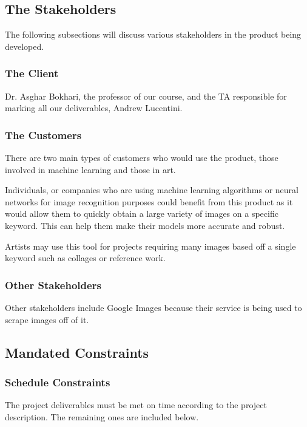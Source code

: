 \documentclass[12pt, titlepage]{article}
\begin{document}
\subsection{The Stakeholders}

The following subsections will discuss various stakeholders in the product being developed.

\subsubsection{The Client}

Dr. Asghar Bokhari, the professor of our course, and the TA responsible for marking all our deliverables, Andrew Lucentini.

\subsubsection{The Customers}

There are two main types of customers who would use the product, those involved in machine learning and those in art.

Individuals, or companies who are using machine learning algorithms or neural networks for image recognition purposes could benefit from this product as it would allow them to quickly obtain a large variety of images on a specific keyword. This can help them make their models more accurate and robust.

Artists may use this tool for projects requiring many images based off a single keyword such as collages or reference work.

\subsubsection{Other Stakeholders}

Other stakeholders include Google Images because their service is being used to scrape images off of it.

\subsection{Mandated Constraints}

\subsubsection{Schedule Constraints}

The project deliverables must be met on time according to the project description. The remaining ones are included below.
\end{document}
